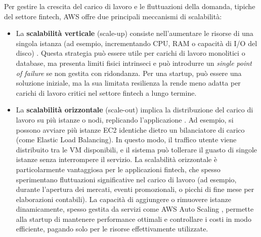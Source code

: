 Per gestire la crescita del carico di lavoro e le fluttuazioni della domanda, tipiche del settore fintech, AWS offre due principali meccanismi di scalabilità:
\begin{itemize}
    \item La \textbf{scalabilità verticale} (scale-up) consiste nell'aumentare le risorse di una singola istanza (ad esempio, incrementando CPU, RAM o capacità di I/O del disco) \cite{awsAutoScaling}. Questa strategia può essere utile per carichi di lavoro monolitici o database, ma presenta limiti fisici intrinseci e può introdurre un \textit{single point of failure} se non gestita con ridondanza. Per una startup, può essere una soluzione iniziale, ma la sua limitata resilienza la rende meno adatta per carichi di lavoro critici nel settore fintech a lungo termine.
    \item La \textbf{scalabilità orizzontale} (scale-out) implica la distribuzione del carico di lavoro su più istanze o nodi, replicando l'applicazione \cite{awsAutoScaling}. Ad esempio, si possono avviare più istanze EC2 identiche dietro un bilanciatore di carico (come Elastic Load Balancing). In questo modo, il traffico utente viene distribuito tra le VM disponibili, e il sistema può tollerare il guasto di singole istanze senza interrompere il servizio. La scalabilità orizzontale è particolarmente vantaggiosa per le applicazioni fintech, che spesso sperimentano fluttuazioni significative nel carico di lavoro (ad esempio, durante l'apertura dei mercati, eventi promozionali, o picchi di fine mese per elaborazioni contabili). La capacità di aggiungere o rimuovere istanze dinamicamente, spesso gestita da servizi come AWS Auto Scaling \cite{awsAutoScaling}, permette alla startup di mantenere performance ottimali e controllare i costi in modo efficiente, pagando solo per le risorse effettivamente utilizzate.
\end{itemize}

